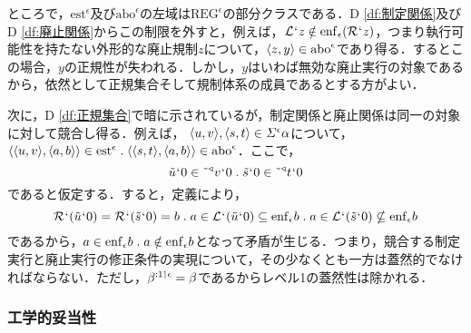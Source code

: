 ところで，$ \mathrm{est}^\epsilon $及び$ \mathrm{abo}^\epsilon $の左域は$ \mathrm{REG}^\epsilon $の部分クラスである．D \ref{df:制定関係}及びD \ref{df:廃止関係}からこの制限を外すと，例えば，$\mathcal{L}{\mspace{1mu}{`}\mspace{1mu}} z\notin \mathrm{enf}_{\epsilon}(\mathcal{R}{\mspace{1mu}{`}\mspace{1mu}} z)$，つまり執行可能性を持たない外形的な廃止規制$z$について，$\langle z,y \rangle\in\mathrm{abo}^\epsilon$であり得る．するとこの場合，$y$の正規性が失われる．しかし，$y$はいわば無効な廃止実行の対象であるから，依然として正規集合そして規制体系の成員であるとする方がよい．

次に，D \ref{df:正規集合}で暗に示されているが，制定関係と廃止関係は同一の対象に対して競合し得る．例えば，
$ \langle u,v \rangle,\langle s,t \rangle\in\varSigma^{\epsilon}\alpha $について，$ \orp{\orp{u,v},\orp{a,b}}\in\mathrm{est}^\epsilon\con{1}\orp{\orp{s,t},\orp{a,b}}\in \mathrm{abo}^\epsilon $．ここで，
\[
    \tilde{u}\fap 0\in \tildel{\trgl{v}}\fap 0\con{1}\tilde{s}\fap 0\in \tildel{\trgl{t}}\fap 0
\]
であると仮定する．すると，定義により，
\[
    \mathcal{R}\fap(\tilde{u}\fap 0) = \mathcal{R}\fap(\tilde{s}\fap 0) = b \con{1}
    a\in \mathcal{L}\fap(\tilde{u}\fap 0)\subseteq \enf{\epsilon}b \con{1}
    a\in \mathcal{L}\fap(\tilde{s}\fap 0)\nsubseteq \enf{\epsilon}b
\]
であるから，$ a\in\enf{\epsilon}b\con{1}a\notin\enf{\epsilon}b $となって矛盾が生じる．つまり，競合する制定実行と廃止実行の修正条件の実現について，その少なくとも一方は蓋然的でなければならない．ただし，$ \beta^{:1\mathbin{\upharpoonleft}\epsilon}=\beta $であるからレベル1の蓋然性は除かれる．

\subsubsection{工学的妥当性}
\label{sssec:工学的妥当性}

